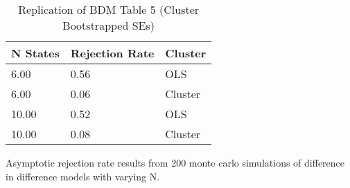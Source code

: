\begin{table}

\caption{Replication of BDM Table 5 (Cluster Bootstrapped SEs)}
\centering
\begin{threeparttable}
\begin{tabular}[t]{lll}
\toprule
N States & Rejection Rate & Cluster\\
\midrule
6.00 & 0.56 & OLS\\
6.00 & 0.06 & Cluster\\
10.00 & 0.52 & OLS\\
10.00 & 0.08 & Cluster\\
\bottomrule
\end{tabular}
\begin{tablenotes}
\item Asymptotic rejection rate results from 200 monte carlo simulations of difference in difference models with varying N.
\end{tablenotes}
\end{threeparttable}
\end{table}
